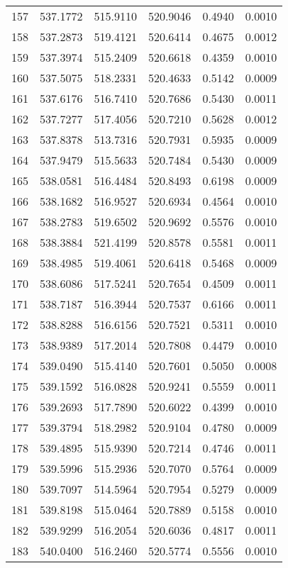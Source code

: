 \documentclass{article}
\begin{document}
\begin{longtable}{|c|c|c|c|c|c|}
157 & 537.1772 & 515.9110 & 520.9046 & 0.4940 & 0.0010 \\
158 & 537.2873 & 519.4121 & 520.6414 & 0.4675 & 0.0012 \\
159 & 537.3974 & 515.2409 & 520.6618 & 0.4359 & 0.0010 \\
160 & 537.5075 & 518.2331 & 520.4633 & 0.5142 & 0.0009 \\
161 & 537.6176 & 516.7410 & 520.7686 & 0.5430 & 0.0011 \\
162 & 537.7277 & 517.4056 & 520.7210 & 0.5628 & 0.0012 \\
163 & 537.8378 & 513.7316 & 520.7931 & 0.5935 & 0.0009 \\
164 & 537.9479 & 515.5633 & 520.7484 & 0.5430 & 0.0009 \\
165 & 538.0581 & 516.4484 & 520.8493 & 0.6198 & 0.0009 \\
166 & 538.1682 & 516.9527 & 520.6934 & 0.4564 & 0.0010 \\
167 & 538.2783 & 519.6502 & 520.9692 & 0.5576 & 0.0010 \\
168 & 538.3884 & 521.4199 & 520.8578 & 0.5581 & 0.0011 \\
169 & 538.4985 & 519.4061 & 520.6418 & 0.5468 & 0.0009 \\
170 & 538.6086 & 517.5241 & 520.7654 & 0.4509 & 0.0011 \\
171 & 538.7187 & 516.3944 & 520.7537 & 0.6166 & 0.0011 \\
172 & 538.8288 & 516.6156 & 520.7521 & 0.5311 & 0.0010 \\
173 & 538.9389 & 517.2014 & 520.7808 & 0.4479 & 0.0010 \\
174 & 539.0490 & 515.4140 & 520.7601 & 0.5050 & 0.0008 \\
175 & 539.1592 & 516.0828 & 520.9241 & 0.5559 & 0.0011 \\
176 & 539.2693 & 517.7890 & 520.6022 & 0.4399 & 0.0010 \\
177 & 539.3794 & 518.2982 & 520.9104 & 0.4780 & 0.0009 \\
178 & 539.4895 & 515.9390 & 520.7214 & 0.4746 & 0.0011 \\
179 & 539.5996 & 515.2936 & 520.7070 & 0.5764 & 0.0009 \\
180 & 539.7097 & 514.5964 & 520.7954 & 0.5279 & 0.0009 \\
181 & 539.8198 & 515.0464 & 520.7889 & 0.5158 & 0.0010 \\
182 & 539.9299 & 516.2054 & 520.6036 & 0.4817 & 0.0011 \\
183 & 540.0400 & 516.2460 & 520.5774 & 0.5556 & 0.0010 \\

\end{longtable}
\end{document}
